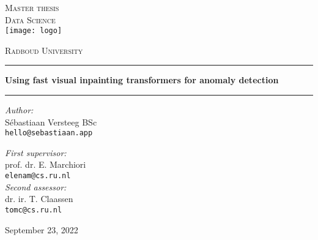 \documentclass[11pt,a4paper]{report}
\begin{document}
\begin{titlepage}
\begin{center}
\textsc{\LARGE Master thesis\\Data Science}\\[.4cm]
\texttt{[image: logo]}

\vspace{0.4cm}
\textsc{\Large Radboud University}\\[2cm]
\hrule
\vspace{0.4cm}
\textbf{\huge Using fast visual inpainting transformers for anomaly detection\\[0.3cm]
\LARGE  
}
\hrule
\vspace{2cm}
\begin{minipage}[t]{0.45\textwidth}
\begin{flushleft} \large
\textit{Author:}\\
Sébastiaan Versteeg BSc\\
\texttt{hello@sebastiaan.app}
\end{flushleft}
\end{minipage}
\begin{minipage}[t]{0.45\textwidth}
\begin{flushright} \large
\textit{First supervisor:}\\
prof. dr. E. Marchiori\\
\texttt{elenam@cs.ru.nl}\\[1.3cm]
\textit{Second assessor:}\\
dr. ir. T. Claassen\\
\texttt{tomc@cs.ru.nl}
\end{flushright}
\end{minipage}
\vfill
{\large September 23, 2022}
\end{center}
\end{titlepage}


% 
\tableofcontents












% 

\end{document}
